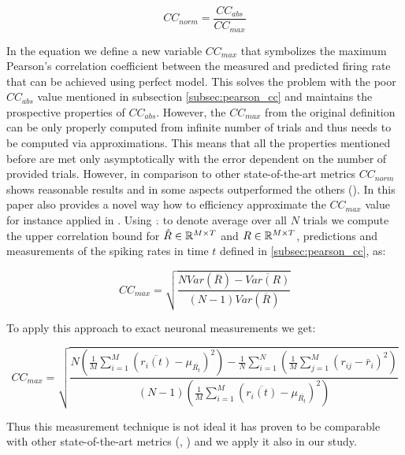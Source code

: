 \begin{equation}
    CC_{norm} = \frac{CC_{abs}}{CC_{max}}
\end{equation}
\label{eq:normalized_cc}

In the equation we define a new variable $CC_{max}$ that symbolizes the maximum Pearson's correlation coefficient between the measured and predicted firing rate that can be achieved using perfect model. This solves the problem with the poor $CC_{abs}$ value mentioned in subsection \ref{subsec:pearson_cc} and maintains the prospective properties of $CC_{abs}$. However, the $CC_{max}$ from the original definition \citet{hsu_quantifying_2004} can be only properly computed from infinite number of trials and thus needs to be computed via approximations. This means that all the properties mentioned before are met only asymptotically with the error dependent on the number of provided trials. However, in comparison to other state-of-the-art metrics $CC_{norm}$ shows reasonable results and in some aspects outperformed the others (\citet{schoppe_measuring_2016}). In this paper \citet{schoppe_measuring_2016} also provides a novel way how to efficiency approximate the $CC_{max}$ value for instance applied in \citet{Wang2023towards}. Using $\overline{.}$ to denote average over all $N$ trials we compute the upper correlation bound for $\hat{R} \in \mathbb{R}^{M \times T}$ and $R \in \mathbb{R}^{M \times T}$, predictions and measurements of the spiking rates in time $t$ defined in \ref{subsec:pearson_cc}, as:

\begin{equation}
    CC_{max} = \sqrt{
        \frac{NVar(\overline{R}) - \overline{Var(R)}}{(N-1)Var(\overline{R})}
    }
\end{equation}
\label{eq:cc_max_general}

To apply this approach to exact neuronal measurements we get:

\begin{equation}
    CC_{max} 
    = \sqrt{
        \frac{
        N \left( \frac{1}{M} \sum_{i=1}^{M} 
        \left( \overline{r_{i}(t)}  - \mu_{\overline{R_t}} \right)^2 
            \right) 
            - \frac{1}{N} \sum_{i=1}^{N} 
                \left( \frac{1}{M} 
                \sum_{j=1}^{M} \left( r_{ij} - \bar{r}_i \right)^2 \right)
        }
        {
            (N - 1) 
            \left( 
                \frac{1}{M} \sum_{i=1}^{M} \left( \overline{r_{i}(t)}  
                - \mu_{\overline{R_t}} \right)^2 
            \right)
        }}
\end{equation}
\label{eq:cc_max_neurons}

Thus this measurement technique is not ideal it has proven to be comparable with other state-of-the-art metrics (\citet{schoppe_measuring_2016}, \citet{pospisil2021eval}) and we apply it also in our study.
